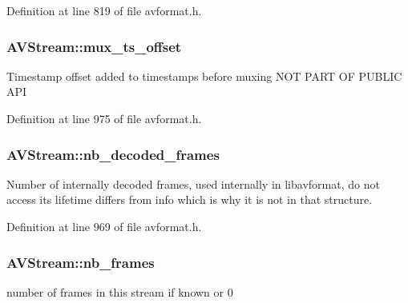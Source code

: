 Definition at line 819 of file avformat.\+h.

\subsubsection[{\texorpdfstring{mux\+\_\+ts\+\_\+offset}{mux_ts_offset}}]{ A\+V\+Stream\+::mux\+\_\+ts\+\_\+offset}\hypertarget{struct_a_v_stream_ae0598c5dc8ff45ac6cb56a7a23847a37}{}\label{struct_a_v_stream_ae0598c5dc8ff45ac6cb56a7a23847a37}
Timestamp offset added to timestamps before muxing N\+OT P\+A\+RT OF P\+U\+B\+L\+IC A\+PI 

Definition at line 975 of file avformat.\+h.

\subsubsection[{\texorpdfstring{nb\+\_\+decoded\+\_\+frames}{nb_decoded_frames}}]{ A\+V\+Stream\+::nb\+\_\+decoded\+\_\+frames}\hypertarget{struct_a_v_stream_a8937969e00c765697d7a8e55a0221e04}{}\label{struct_a_v_stream_a8937969e00c765697d7a8e55a0221e04}
Number of internally decoded frames, used internally in libavformat, do not access its lifetime differs from info which is why it is not in that structure. 

Definition at line 969 of file avformat.\+h.

\subsubsection[{\texorpdfstring{nb\+\_\+frames}{nb_frames}}]{ A\+V\+Stream\+::nb\+\_\+frames}\hypertarget{struct_a_v_stream_a4382c3064df1c9eb232ac198dec067f9}{}\label{struct_a_v_stream_a4382c3064df1c9eb232ac198dec067f9}


number of frames in this stream if known or 0 




